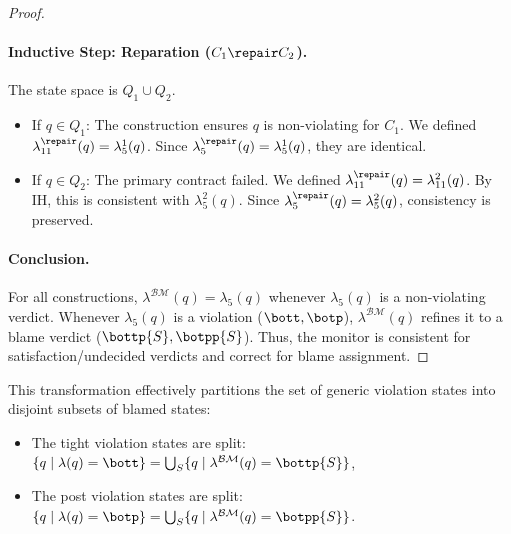 \begin{definition}
\begin{proof}
    \paragraph{Inductive Step: Reparation ($C_1 \repair C_2$).}
    The state space is $Q_1 \cup Q_2$.
    \begin{itemize}
        \item If $q \in Q_1$: The construction ensures $q$ is non-violating for $C_1$. We defined $\lambda_{11}^{\repair}(q) = \lambda_5^1(q)$. Since $\lambda_5^{\repair}(q) = \lambda_5^1(q)$, they are identical.
        \item If $q \in Q_2$: The primary contract failed. We defined $\lambda_{11}^{\repair}(q) = \lambda_{11}^2(q)$. By IH, this is consistent with $\lambda_5^2(q)$. Since $\lambda_5^{\repair}(q) = \lambda_5^2(q)$, consistency is preserved.
    \end{itemize}
    
    \paragraph{Conclusion.}
    For all constructions, $\lambda^{\mathcal{BM}}(q) = \lambda_5(q)$ whenever $\lambda_5(q)$ is a non-violating verdict. Whenever $\lambda_5(q)$ is a violation ($\bott, \botp$), $\lambda^{\mathcal{BM}}(q)$ refines it to a blame verdict ($\bottp{S}, \botpp{S}$). Thus, the monitor is consistent for satisfaction/undecided verdicts and correct for blame assignment.
    \end{proof}
  
  This transformation effectively partitions the set of generic violation states into disjoint subsets of blamed states:
  \begin{itemize}
      \item The tight violation states are split: $\{q \mid \lambda(q)=\bott\} = \bigcup_{S} \{q \mid \lambda^{\mathcal{BM}}(q)=\bottp{S}\}$,
      \item The post violation states are split: $\{q \mid \lambda(q)=\botp\} = \bigcup_{S} \{q \mid \lambda^{\mathcal{BM}}(q)=\botpp{S}\}$.
  \end{itemize}
  \end{definition}

